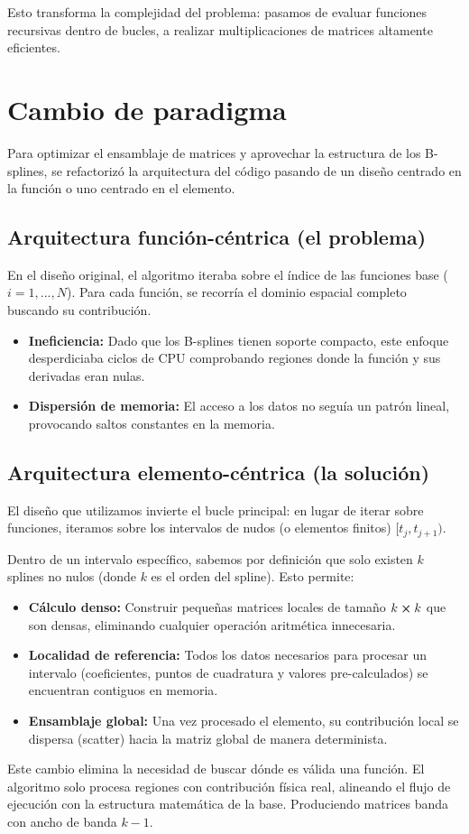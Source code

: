 \documentclass[12pt, a4paper, oneside, spanish]{article}
\begin{document}
Esto transforma la complejidad del problema: pasamos de evaluar funciones recursivas dentro de bucles, a realizar multiplicaciones de matrices altamente eficientes.


\section{Cambio de paradigma}

Para optimizar el ensamblaje de matrices y aprovechar la estructura de los B-splines, se refactorizó la arquitectura del código pasando de un diseño centrado en la función o uno centrado en el elemento.

\subsection{Arquitectura función-céntrica (el problema)}

En el diseño original, el algoritmo iteraba sobre el índice de las funciones base (\( i = 1,...,N \)). Para cada función, se recorría el dominio espacial completo buscando su contribución.

\begin{itemize}
\item \textbf{Ineficiencia:} Dado que los B-splines tienen soporte compacto, este enfoque desperdiciaba ciclos de CPU comprobando regiones donde la función y sus derivadas eran nulas.
\item \textbf{Dispersión de memoria:} El acceso a los datos no seguía un patrón lineal, provocando saltos constantes en la memoria.
\end{itemize}

\subsection{Arquitectura elemento-céntrica (la solución)}

El diseño que utilizamos invierte el bucle principal: en lugar de iterar sobre funciones, iteramos sobre los intervalos de nudos (o elementos finitos) \( [t_j, t_{j+1}) \).

Dentro de un intervalo específico, sabemos por definición que solo existen \( k \) splines no nulos (donde \( k \) es el orden del spline). Esto permite:

\begin{itemize}
\item \textbf{Cálculo denso:} Construir pequeñas matrices locales de tamaño \( k \cross k \) que son densas, eliminando cualquier operación aritmética innecesaria.
\item \textbf{Localidad de referencia:} Todos los datos necesarios para procesar un intervalo (coeficientes, puntos de cuadratura y valores pre-calculados) se encuentran contiguos en memoria.
\item \textbf{Ensamblaje global:} Una vez procesado el elemento, su contribución local se dispersa (scatter) hacia la matriz global de manera determinista.
\end{itemize}

Este cambio elimina la necesidad de buscar dónde es válida una función. El algoritmo solo procesa regiones con contribución física real, alineando el flujo de ejecución con la estructura matemática de la base. Produciendo matrices banda con ancho de banda \( k-1 \).
\end{document}
